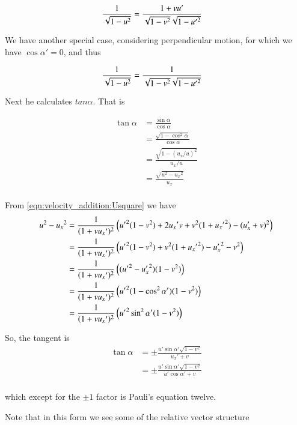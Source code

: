 \begin{align*}
\frac{1}{\sqrt{1-u^2}} 
&= \frac{ 1 + v u' }{\sqrt{1 -v^2 }\sqrt{1 -{u'}^2}}
\end{align*}

We have another special case, considering perpendicular motion, for which we have $\cos\alpha' = 0$, and thus

\begin{align*}
\frac{1}{\sqrt{1-u^2}} 
&= \frac{ 1 }{\sqrt{1 -v^2 }\sqrt{1 -{u'}^2}}
\end{align*}

Next he calculates $tan \alpha$.  That is

\begin{align*}
\tan\alpha 
&= \frac{\sin\alpha}{\cos\alpha} \\
&= \frac{\sqrt{1-\cos^2\alpha}}{\cos\alpha} \\
&= \frac{\sqrt{1-(u_x/u)^2}}{u_x/u} \\
&= \frac{\sqrt{u^2- {u_x}^2}}{u_x} \\
\end{align*}

From \ref{eqn:velocity_addition:Usquare} we have
\begin{align*}
u^2 - {u_x}^2
&= \frac{1}{( 1 + v {u_x}' )^2 } \left(
{{u}'}^2(1-v^2)
+ 2 {u_x}' v
+v^2 (1 + {{u_x}'}^2)
-(u_x' + v)^2
\right) \\
&= \frac{1}{( 1 + v {u_x}' )^2 } \left(
{{u}'}^2(1-v^2)
+v^2 (1 + {{u_x}'}^2)
- {u_x'}^2 
- v^2 
\right) \\
&= \frac{1}{( 1 + v {u_x}' )^2 } \left(
({{u}'}^2 -{u_x'}^2) (1-v^2)
\right) \\
&= \frac{1}{( 1 + v {u_x}' )^2 } \left(
{{u}'}^2(1 -\cos^2\alpha') (1-v^2)
\right) \\
&= \frac{1}{( 1 + v {u_x}' )^2 } \left(
{{u}'}^2 \sin^2\alpha' (1-v^2)
\right) \\
\end{align*}

So, the tangent is
\begin{align*}
\tan\alpha 
&= \pm \frac{ u' \sin\alpha' \sqrt{1-v^2}}{ {u_x}' + v  } \\
&= \pm \frac{ u' \sin\alpha' \sqrt{1-v^2}}{ u'\cos\alpha' + v  } \\
\end{align*}

which except for the $\pm 1$ factor is Pauli's equation twelve.

Note that in this form we see some of the relative vector structure


